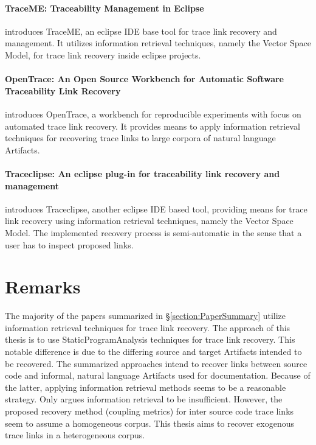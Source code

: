 
\paragraph*{TraceME: Traceability Management in Eclipse}
\cite{TraceME}
introduces TraceME, an eclipse \gls{IDE} base tool for trace link recovery and management.
It utilizes information retrieval techniques, namely the Vector Space Model, for trace link recovery inside eclipse projects.

\paragraph*{OpenTrace: An Open Source Workbench for Automatic Software Traceability Link Recovery}
\cite{OpenTrace}
introduces OpenTrace, a workbench for reproducible experiments with focus on automated trace link recovery.
It provides means to apply information retrieval techniques for recovering trace links to large corpora of natural language \glspl{Artifact}.

\paragraph*{Traceclipse: An eclipse plug-in for traceability link recovery and management}
\cite{Traceclipse}
introduces Traceclipse, another eclipse \gls{IDE} based tool, providing means for trace link recovery using information retrieval techniques, namely the Vector Space Model.
The implemented recovery process is semi-automatic in the sense that a user has to inspect proposed links.


\section{Remarks}
\label{section:Remarks}
The majority of the papers summarized in §\ref{section:PaperSummary} utilize information retrieval techniques for trace link recovery.
The approach of this thesis is to use \gls{StaticProgramAnalysis} techniques for trace link recovery.
This notable difference is due to the differing source and target \glspl{Artifact} intended to be recovered.
The summarized approaches intend to recover links between source code and informal, natural language \glspl{Artifact} used for documentation.
Because of the latter, applying information retrieval methods seems to be a reasonable strategy.
Only \cite{McMillanPR2009} argues information retrieval to be insufficient.
However, the proposed recovery method (coupling metrics) for inter source code trace links seem to assume a homogeneous corpus.
This thesis aims to recover exogenous trace links in a heterogeneous corpus.
 

